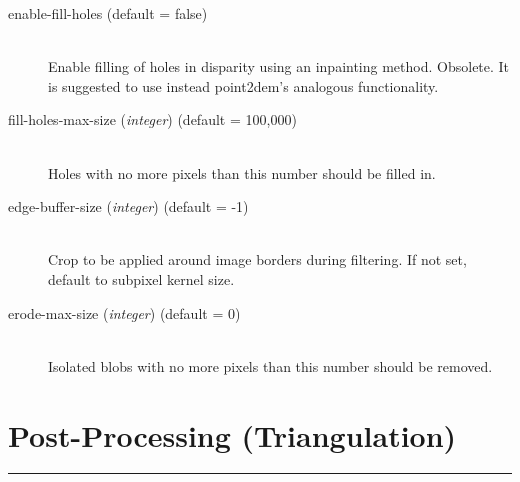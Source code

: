 \begin{description}
\item[enable-fill-holes (default = false)] \hfill \\

Enable filling of holes in disparity using an inpainting
method. Obsolete. It is suggested to use instead point2dem's analogous
functionality.

\item[fill-holes-max-size \textnormal{\small{(\emph{integer})}} (default = 100,000)] \hfill \\
  Holes with no more pixels than this number should be filled in.
\item[edge-buffer-size \textnormal{\small{(\emph{integer})}} (default = -1)] \hfill \\
  Crop to be applied around image borders during filtering.  If not set, default to subpixel kernel size.
\item[erode-max-size \textnormal{\small{(\emph{integer})}} (default = 0)] \hfill \\
  Isolated blobs with no more pixels than this number should be removed.

\end{description}


\section{Post-Processing (Triangulation)}
\label{triangulation_options}
\hrule
\bigskip


